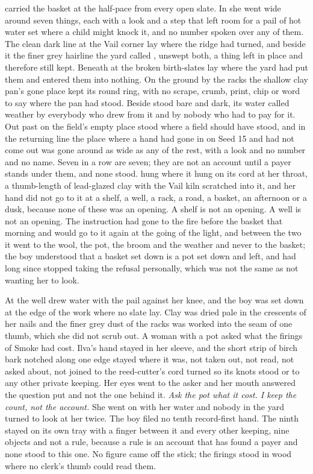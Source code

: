  carried the basket at the half-pace from every open slate. In  she went wide around seven things, each with a look and a step that left room for a pail of hot water set where a child might knock it, and no number spoken over any of them. The clean dark line at the Vail corner lay where the  ridge had turned, and beside it the finer grey hairline the yard called , unswept both, a thing left in place and therefore still kept. Beneath  at  the broken birth-slates lay where the yard had put them and entered them into nothing. On the ground by the racks the shallow clay pan's gone place kept its round ring, with no scrape, crumb, print, chip or word to say where the pan had stood. Beside   stood bare and dark, its water called weather by everybody who drew from it and by nobody who had to pay for it. Out past  on  the field's empty place stood where a field should have stood, and in the returning line the place where a hand had gone in on Seed 15 and had not come out was gone around as wide as any of the rest, with a look and no number and no name. Seven in a row are seven; they are not an account until a payer stands under them, and none stood.  hung where it hung on its cord at her throat, a thumb-length of lead-glazed clay with the Vail kiln scratched into it, and her hand did not go to it at a shelf, a well, a rack, a road, a basket, an afternoon or a dusk, because none of these was an opening. A shelf is not an opening. A well is not an opening. The instruction had gone to the fire before the basket that morning and would go to it again at the going of the light, and between the two it went to the wool, the pot, the broom and the weather and never to the basket; the boy understood that a basket set down is a pot set down and left, and had long since stopped taking the refusal personally, which was not the same as not wanting her to look.

At the well  drew water with the pail against her knee, and the boy was set down at the edge of the work where no slate lay. Clay was dried pale in the crescents of her nails and the finer grey dust of the racks was worked into the seam of one thumb, which she did not scrub out. A woman with a pot asked what the firings of Smoke had cost. Ilva's hand stayed in her sleeve, and the short strip of birch bark notched along one edge stayed where it was, not taken out, not read, not asked about, not joined to the reed-cutter's cord turned so its knots stood or to any other private keeping. Her eyes went to the asker and her mouth answered the question put and not the one behind it. \emph{Ask the pot what it cost. I keep the count, not the account.} She went on with her water and nobody in the yard turned to look at her twice. The boy filed no tenth record-first hand. The ninth stayed on its own tray with a finger between it and every other keeping, nine objects and not a rule, because a rule is an account that has found a payer and none stood to this one. No figure came off the stick; the firings stood in wood where no clerk's thumb could read them.

